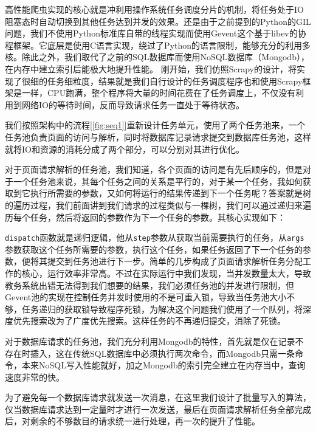 \documentclass[UTF8, zihao=-4]{ctexart}
\begin{document}
    高性能爬虫实现的核心就是冲利用操作系统任务调度分片的机制，将任务处于IO阻塞态时自动切换到其他任务达到并发的效果。还是由于之前提到的Python的GIL问题，我们不使用Python标准库自带的线程实现而使用Gevent这个基于libev的协程框架。它底层是使用C语言实现，绕过了Python的语言限制，能够充分的利用多核。除此之外，我们取代了之前的SQL数据库而使用NoSQL数据库（Mongodb），在内存中建立索引后能极大地提升性能。
    刚开始，我们仿照Scrapy的设计，将实现了很细的任务细粒度，结果就是我们自行设计的任务调度程序也和使用Scrapy框架是一样，CPU跑满，整个程序将大量的时间花费在了任务调度上，不仅没有利用到网络IO的等待时间，反而导致请求任务一直处于等待状态。\par
    我们按照架构中的流程[\ref{fig:seq1}]重新设计任务单元，使用了两个任务池来，一个任务池负责页面的访问与解析，同时将数据库记录请求提交到数据库任务池，这样就将IO和资源的消耗分成了两个部分，可以分别对其进行优化。\par
    对于页面请求解析的任务池，我们知道，各个页面的访问是有先后顺序的，但是对于一个任务池来说，其每个任务之间的关系是平行的，对于某一个任务，我如何获取到它执行所需要的参数，又如何将运行的结果传递到下一个任务呢？答案就是树的遍历过程，我们前面讲到我们请求的过程类似与一棵树，我们可以通过递归来遍历每个任务，然后将返回的参数作为下一个任务的参数。其核心实现如下：

    
    
    \verb|dispatch|函数就是递归逻辑，他从\verb|step|参数从获取当前需要执行的任务，从\verb|args|参数获取这个任务所需要的参数，执行这个任务，如果任务返回了下一个任务的参数，便将其提交到任务池进行下一步。简单的几步构成了页面请求解析任务分配工作的核心，运行效率非常高。不过在实际运行中我们发现，当并发数量太大，导致教务系统出错无法得到我们想要的结果，我们必须任务池的并发进行限制，但Gevent池的实现在控制任务并发时使用的不是可重入锁，导致当任务池大小不够，任务递归的获取锁导致程序死锁，为解决这个问题我们使用了一个队列，将深度优先搜索改为了广度优先搜索。这样任务的不再递归提交，消除了死锁。

      
       
    对于数据库请求的任务池，我们充分利用Mongodb的特性，首先就是仅在记录不存在时插入，这在传统SQL数据库中必须执行两次命令，而Mongodb只需一条命令，本来NoSQL写入性能就好，加之Mongodb的索引完全建立在内存当中，查询速度非常的快。\par
    为了避免每一个数据库请求就发送一次消息，在这里我们设计了批量写入的算法，仅当数据库请求达到一定量时才进行一次发送，最后在页面请求解析任务全部完成后，对剩余的不够数目的请求统一进行处理，再一次的提升了性能。
\end{document}
